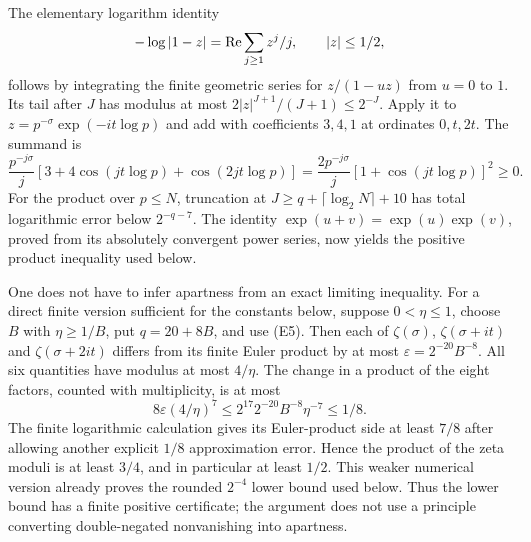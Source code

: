 The elementary logarithm identity
\[
 -\log|1-z|=\mathop{\rm Re}\sum_{j\ge1}z^j/j,
                  \qquad |z|\le1/2,
\]
follows by integrating the finite geometric series for
$z/(1-uz)$ from $u=0$ to $1$. Its tail after $J$ has modulus at most
$2|z|^{J+1}/(J+1)\le2^{-J}$. Apply it to
$z=p^{-\sigma}\exp(-it\log p)$ and add with coefficients $3,4,1$ at
ordinates $0,t,2t$. The summand is
\[
 \frac{p^{-j\sigma}}j
 [3+4\cos(jt\log p)+\cos(2jt\log p)]
 =\frac{2p^{-j\sigma}}j[1+\cos(jt\log p)]^2\ge0.
\]
For the product over $p\le N$, truncation at
$J\ge q+\lceil\log_2N\rceil+10$ has total logarithmic error below
$2^{-q-7}$. The identity $\exp(u+v)=\exp(u)\exp(v)$, proved from its
absolutely convergent power series, now yields the positive product
inequality used below.

One does not have to infer apartness from an exact limiting inequality.
For a direct finite version sufficient for the constants below, suppose
$0<\eta\le1$, choose $B$ with $\eta\ge1/B$, put $q=20+8B$, and use (E5).
Then each of $\zeta(\sigma)$, $\zeta(\sigma+it)$ and
$\zeta(\sigma+2it)$ differs from its finite Euler product by at most
$\varepsilon=2^{-20}B^{-8}$. All six quantities have modulus at most
$4/\eta$. The change in a product of the eight factors, counted with
multiplicity, is at most
\[
 8\varepsilon(4/\eta)^7
 \le2^{17}2^{-20}B^{-8}\eta^{-7}\le1/8.
\]
The finite logarithmic calculation gives its Euler-product side at least
$7/8$ after allowing another explicit $1/8$ approximation error. Hence
the product of the zeta moduli is at least $3/4$, and in particular at
least $1/2$. This weaker numerical version already proves the rounded
$2^{-4}$ lower bound used below. Thus the lower bound has a finite
positive certificate; the argument does not use a principle converting
double-negated nonvanishing into apartness.

